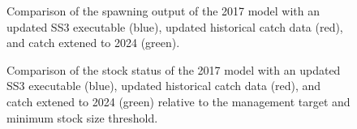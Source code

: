 \documentclass[
]{scrartcl}
\begin{document}
\begin{figure}


\caption{\label{fig-bridge3-comp2}Comparison of the spawning output of
the 2017 model with an updated SS3 executable (blue), updated historical
catch data (red), and catch extened to 2024 (green).}

\end{figure}%

\begin{figure}


\caption{\label{fig-bridge3-comp4}Comparison of the stock status of the
2017 model with an updated SS3 executable (blue), updated historical
catch data (red), and catch extened to 2024 (green) relative to the
management target and minimum stock size threshold.}

\end{figure}%
\end{document}
